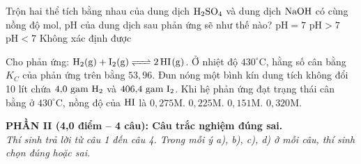 \documentclass[12pt,a4paper]{article}
\begin{document}
\begin{ex}
Trộn hai thể tích bằng nhau của dung dịch $\ce{H2SO4}$ và dung dịch $\ce{NaOH}$ có cùng nồng độ mol, pH của dung dịch sau phản ứng sẽ như thế nào?
\choice
{$\text{pH} = 7$}
{$\text{pH} > 7$}
{\True $\text{pH} < 7$}
{Không xác định được}
\end{ex}

\begin{ex}
Cho phản ứng: $\ce{H2(g) + I2(g) <=> 2HI(g)}$. Ở nhiệt độ $430^\circ\text{C}$, hằng số cân bằng $K_C$ của phản ứng trên bằng $53{,}96$. Đun nóng một bình kín dung tích không đổi 10 lít chứa $4{,}0\text{ gam } \ce{H2}$ và $406{,}4\text{ gam } \ce{I2}$. Khi hệ phản ứng đạt trạng thái cân bằng ở $430^\circ\text{C}$, nồng độ của $\ce{HI}$ là
\choice
{\True $0{,}275\text{M}.$}
{$0{,}225\text{M}.$}
{$0{,}151\text{M}.$}
{$0{,}320\text{M}.$}
\end{ex}


\bigskip
\noindent
\textbf{PHẦN II (4,0 điểm -- 4 câu): Câu trắc nghiệm đúng sai.}\\
\textit{Thí sinh trả lời từ câu 1 đến câu 4. Trong mỗi ý a), b), c), d) ở mỗi câu, thí sinh chọn đúng hoặc sai.}
\end{document}
